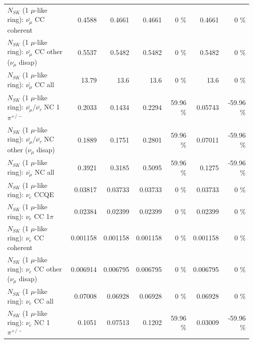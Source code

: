\begin{table}
\begin{tabular}{| l | r | r | r  r | r  r |}
                       $N_{SK}$ (1 $\mu$-like ring): $\bar{\nu_\mu}$ CC coherent &          0.4588 &          0.4661 &          0.4661 &        0 \%  &          0.4661 &        0 \%  \\ 
        $N_{SK}$ (1 $\mu$-like ring): $\bar{\nu_\mu}$ CC other ($\nu_\mu$ disap) &          0.5537 &          0.5482 &          0.5482 &        0 \%  &          0.5482 &        0 \%  \\ 
                          $N_{SK}$ (1 $\mu$-like ring): $\bar{\nu_{\mu}}$ CC all &           13.79 &            13.6 &            13.6 &        0 \%  &            13.6 &        0 \%  \\ 
\hline
  $N_{SK}$ (1 $\mu$-like ring): $\bar{\nu_\mu}$/$\bar{\nu_\tau}$ NC 1$\pi^{+/-}$ &          0.2033 &          0.1434 &          0.2294 &    59.96 \%  &         0.05743 &   -59.96 \%  \\ 
$N_{SK}$ (1 $\mu$-like ring): $\bar{\nu_\mu}$/$\bar{\nu_\tau}$ NC other ($\nu_\mu$ disap) &          0.1889 &          0.1751 &          0.2801 &    59.96 \%  &         0.07011 &   -59.96 \%  \\ 
                          $N_{SK}$ (1 $\mu$-like ring): $\bar{\nu_{\mu}}$ NC all &          0.3921 &          0.3185 &          0.5095 &    59.96 \%  &          0.1275 &   -59.96 \%  \\ 
\hline
\hline
\hline
                                      $N_{SK}$ (1 $\mu$-like ring): $\nu_e$ CCQE &         0.03817 &         0.03733 &         0.03733 &        0 \%  &         0.03733 &        0 \%  \\ 
                                 $N_{SK}$ (1 $\mu$-like ring): $\nu_e$ CC 1$\pi$ &         0.02384 &         0.02399 &         0.02399 &        0 \%  &         0.02399 &        0 \%  \\ 
                               $N_{SK}$ (1 $\mu$-like ring): $\nu_e$ CC coherent &        0.001158 &        0.001158 &        0.001158 &        0 \%  &        0.001158 &        0 \%  \\ 
                $N_{SK}$ (1 $\mu$-like ring): $\nu_e$ CC other ($\nu_\mu$ disap) &        0.006914 &        0.006795 &        0.006795 &        0 \%  &        0.006795 &        0 \%  \\ 
                                  $N_{SK}$ (1 $\mu$-like ring): $\nu_{e}$ CC all &         0.07008 &         0.06928 &         0.06928 &        0 \%  &         0.06928 &        0 \%  \\ 
\hline
                           $N_{SK}$ (1 $\mu$-like ring): $\nu_e$ NC 1$\pi^{+/-}$ &          0.1051 &         0.07513 &          0.1202 &    59.96 \%  &         0.03009 &   -59.96 \%  \\ 

\end{tabular}
\end{table}
